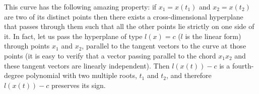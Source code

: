 \documentclass[12pt]{amsart}
\begin{document}
\begin{enumerate}
This curve has the following amazing property: if $x_1=x(t_1)$ and $x_2=x(t_2)$
are two of its distinct points then there exists a cross-dimensional hyperplane
that passes through them such that all the other points lie strictly on one side
of it.
In fact, let us pass the hyperplane of type $l(x)=c$ ($l$ is the linear form)
through points $x_1$ and $x_2$, parallel to the tangent vectors to the curve at
those points (it is easy to verify that a vector passing parallel to the chord
$x_1x_2$ and these tangent vectors are linearly independent).
Then $l(x(t))-c$ is a fourth-degree polynomial with two multiple roots, $t_1$
and $t_2$, and therefore $l(x(t))-c$ preserves its sign.
\end{enumerate}
\end{document}
